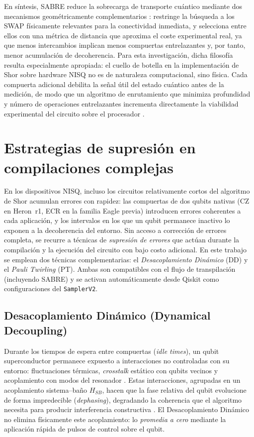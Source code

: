 \documentclass[12pt, spanish]{book}
\begin{document}
En síntesis, SABRE reduce la sobrecarga de transporte cuántico mediante dos mecanismos geométricamente complementarios \cite{Li2019SABRE}: restringe la búsqueda a los SWAP físicamente relevantes para la conectividad inmediata, y selecciona entre ellos con una métrica de distancia que aproxima el coste experimental real, ya que menos intercambios implican menos compuertas entrelazantes y, por tanto, menor acumulación de decoherencia. Para esta investigación, dicha filosofía resulta especialmente apropiada: el cuello de botella en la implementación de Shor sobre hardware NISQ no es de naturaleza computacional, sino física. Cada compuerta adicional debilita la señal útil del estado cuántico antes de la medición, de modo que un algoritmo de enrutamiento que minimiza profundidad y número de operaciones entrelazantes incrementa directamente la viabilidad experimental del circuito sobre el procesador \cite{IBM_SABRE2026}.


\section{Estrategias de supresión en compilaciones complejas}
\label{sec:supresion_errores}

En los dispositivos NISQ, incluso los circuitos relativamente cortos del algoritmo de Shor acumulan errores con rapidez: las compuertas de dos qubits nativas (CZ en Heron~r1, ECR en la familia Eagle previa) introducen errores coherentes a cada aplicación, y los intervalos en los que un qubit permanece inactivo lo exponen a la decoherencia del entorno. Sin acceso a corrección de errores completa, se recurre a técnicas de \textit{supresión de errores} que actúan durante la compilación y la ejecución del circuito con bajo costo adicional. En este trabajo se emplean dos técnicas complementarias: el \textit{Desacoplamiento Dinámico} (DD) y el \textit{Pauli Twirling} (PT). Ambas son compatibles con el flujo de transpilación (incluyendo SABRE) y se activan automáticamente desde Qiskit como configuraciones del \texttt{SamplerV2}.

\subsection{Desacoplamiento Dinámico (Dynamical Decoupling)}

Durante los tiempos de espera entre compuertas (\textit{idle times}), un qubit superconductor permanece expuesto a interacciones no controladas con su entorno: fluctuaciones térmicas, \textit{crosstalk} estático con qubits vecinos y acoplamiento con modos del resonador \cite{Ezzell2023, AbuGhanem2025}. Estas interacciones, agrupadas en un acoplamiento sistema--baño $H_{SB}$, hacen que la fase relativa del qubit evolucione de forma impredecible (\textit{dephasing}), degradando la coherencia que el algoritmo necesita para producir interferencia constructiva \cite{ViolaKnillLloyd1999}. El Desacoplamiento Dinámico no elimina físicamente este acoplamiento: lo \textit{promedia a cero} mediante la aplicación rápida de pulsos de control sobre el qubit.\\
\end{document}
